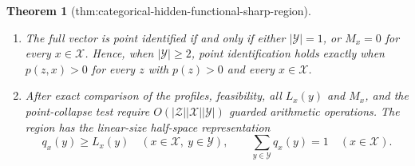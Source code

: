 \documentclass{article}
\newtheorem{theorem}{Theorem}
\begin{document}
\begin{theorem}[thm:categorical-hidden-functional-sharp-region]
\begin{enumerate}
obtained in the model above by setting, for every assigned profile whose
\(X\)-row misses \(x\), the common outcome row
\[
 s_x=\frac{q_x-L_x}{M_x}\quad\text{when }M_x>0
\]
for a desired \(q_x\in L_x+M_x\Delta(\mathcal Y)\); when \(M_x=0\), the
row is irrelevant and may be arbitrary.  The choices are independent
across \(x\).  If both \(p\) and the desired vector \(q\) are rational,
this attaining model can be chosen rational.
\item The full vector is point identified if and only if either
\(\lvert\mathcal Y\rvert=1\), or \(M_x=0\) for every
\(x\in\mathcal X\).  Hence, when \(\lvert\mathcal Y\rvert\geq2\), point
identification holds exactly when \(p(z,x)>0\) for every \(z\) with
\(p(z)>0\) and every \(x\in\mathcal X\).
\item After exact comparison of the profiles, feasibility, all
\(L_x(y)\) and \(M_x\), and the point-collapse test require
\(O(\lvert\mathcal Z\rvert\lvert\mathcal X\rvert
\lvert\mathcal Y\rvert)\) guarded arithmetic operations.  The region has
the linear-size half-space representation
\[
 q_x(y)\geq L_x(y)\quad(x\in\mathcal X,\ y\in\mathcal Y),
 \qquad
 \sum_{y\in\mathcal Y}q_x(y)=1\quad(x\in\mathcal X).
\]
\end{enumerate}
\end{theorem}
\end{document}
